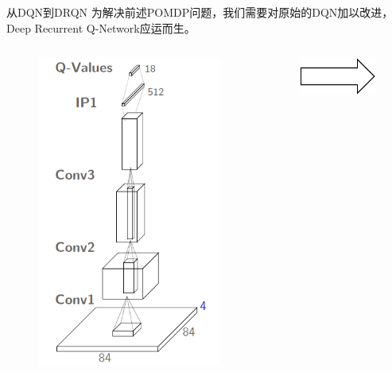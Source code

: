 \documentclass[10pt]{beamer}
\begin{document}
	\begin{frame}{从DQN到DRQN}
		为解决前述POMDP问题，我们需要对原始的DQN加以改进，Deep Recurrent Q-Network应运而生。
		\begin{columns}[c]
			\begin{column}{.4\linewidth}
				\begin{figure}
					\centering
					\includegraphics[width=0.9\linewidth]{pictures/dqn-architecture-2}
				\end{figure}
			\end{column}
			\begin{column}{.1\linewidth}
				\begin{figure}
					\centering
					\includegraphics[width=0.9\linewidth]{pictures/big-arrow}

\end{figure}
\end{column}
\end{columns}
\end{frame}
\end{document}
